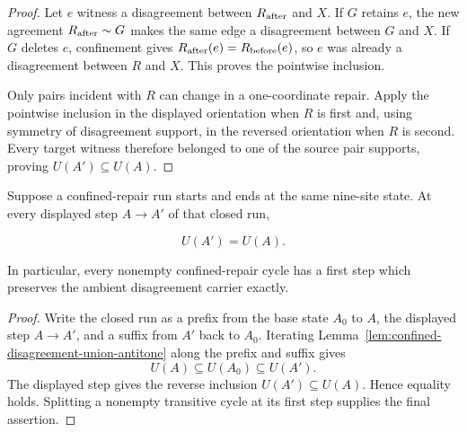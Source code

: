 \begin{proof}
Let $e$ witness a disagreement between $R_{\rm after}$ and $X$.  If $G$
retains $e$, the new agreement $R_{\rm after}\sim G$ makes the same edge a
disagreement between $G$ and $X$.  If $G$ deletes $e$, confinement gives
$R_{\rm after}(e)=R_{\rm before}(e)$, so $e$ was already a disagreement
between $R$ and $X$.  This proves the pointwise inclusion.

Only pairs incident with $R$ can change in a one-coordinate repair.  Apply
the pointwise inclusion in the displayed orientation when $R$ is first and,
using symmetry of disagreement support, in the reversed orientation when
$R$ is second.  Every target witness therefore belonged to one of the source
pair supports, proving $U(A')\subseteq U(A)$.
\end{proof}

\begin{lemma}
\label{lem:closed-confined-repair-carrier-rigidity}
Suppose a confined-repair run starts and ends at the same nine-site state.
At every displayed step $A\longrightarrow A'$ of that closed run,

\[
                              U(A')=U(A).
\]

In particular, every nonempty confined-repair cycle has a first step which
preserves the ambient disagreement carrier exactly.
\end{lemma}

\begin{proof}
Write the closed run as a prefix from the base state $A_0$ to $A$, the
displayed step $A\longrightarrow A'$, and a suffix from $A'$ back to
$A_0$.  Iterating
Lemma~\ref{lem:confined-disagreement-union-antitone} along the prefix and
suffix gives
\[
                  U(A)\subseteq U(A_0)\subseteq U(A').
\]
The displayed step gives the reverse inclusion
$U(A')\subseteq U(A)$.  Hence equality holds.  Splitting a nonempty
transitive cycle at its first step supplies the final assertion.
\end{proof}

